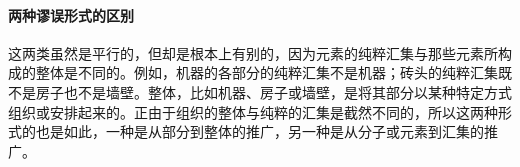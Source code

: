 \paragraph{两种谬误形式的区别}
\begin{examplebox}[title=两种谬误形式的区别]
这两类虽然是平行的，但却是根本上有别的，因为元素的纯粹汇集与那些元素所构成的整体是不同的。例如，机器的各部分的纯粹汇集不是机器；砖头的纯粹汇集既不是房子也不是墙壁。整体，比如机器、房子或墙壁，是将其部分以某种特定方式组织或安排起来的。正由于组织的整体与纯粹的汇集是截然不同的，所以这两种形式的也是如此，一种是从部分到整体的推广，另一种是从分子或元素到汇集的推广。
\end{examplebox}